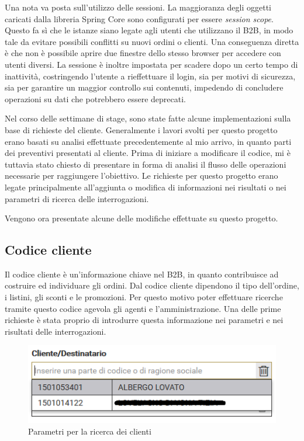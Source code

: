Una nota va posta sull'utilizzo delle sessioni. La maggioranza degli oggetti caricati dalla libreria Spring Core sono configurati per essere \textit{session scope}. Questo fa sì che le istanze siano legate agli utenti che utilizzano il B2B, in modo tale da evitare possibili conflitti su nuovi ordini o clienti. Una conseguenza diretta è che non è possibile aprire due finestre dello stesso browser per accedere con utenti diversi. La sessione è inoltre impostata per scadere dopo un certo tempo di inattività, costringendo l'utente a rieffettuare il login, sia per motivi di sicurezza, sia per garantire un maggior controllo sui contenuti, impedendo di concludere operazioni su dati che potrebbero essere deprecati.

Nel corso delle settimane di stage, sono state fatte alcune implementazioni sulla base di richieste del cliente. Generalmente i lavori svolti per questo progetto erano basati su analisi effettuate precedentemente al mio arrivo, in quanto parti dei preventivi presentati al cliente. Prima di iniziare a modificare il codice, mi è tuttavia stato chiesto di presentare in forma di analisi il flusso delle operazioni necessarie per raggiungere l'obiettivo. Le richieste per questo progetto erano legate principalmente all'aggiunta o modifica di informazioni nei risultati o nei parametri di ricerca delle interrogazioni.

Vengono ora presentate alcune delle modifiche effettuate su questo progetto.

\subsection{Codice cliente}
Il codice cliente è un'informazione chiave nel B2B, in quanto contribuisce ad costruire ed individuare gli ordini. Dal codice cliente dipendono il tipo dell'ordine, i listini, gli sconti e le promozioni. Per questo motivo poter effettuare ricerche tramite questo codice agevola gli agenti e l'amministrazione. Una delle prime richieste è stata proprio di introdurre questa informazione nei parametri e nei risultati delle interrogazioni.
\begin{figure}
	\centering
	\includegraphics{Immagini/p1/clienti-params.png}
	\caption{Parametri per la ricerca dei clienti}
	\label{fig:clienti-params}
\end{figure}

